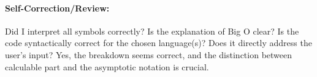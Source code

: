 \documentclass{book}
\begin{document}
\paragraph*{Self-Correction/Review:}
 Did I interpret all symbols correctly? Is the explanation of Big O clear? Is the code syntactically correct for the chosen language(s)? Does it directly address the user’s input? Yes, the breakdown seems correct, and the distinction between calculable part and the asymptotic notation is crucial.	
\end{document}
